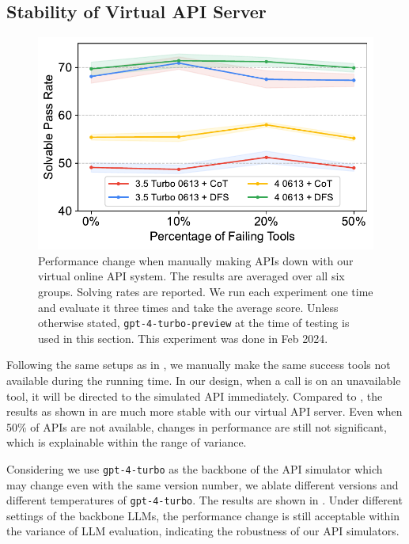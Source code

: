 \subsection{Stability of Virtual API Server}
\begin{figure}[h!]
    \centering
    \includegraphics[width=\linewidth]{figs/virtual_solving_scores.pdf}
    \caption{Performance change when manually making APIs down with our virtual online API system. The results are averaged over all six groups. Solving rates are reported. We run each experiment one time and evaluate it three times and take the average score. Unless otherwise stated, \texttt{gpt-4-turbo-preview} at the time of testing is used in this section. This experiment was done in Feb 2024.}
    \label{fig:simulated_api_stability_test}
\end{figure}

Following the same setups as in , we manually make the same success tools not available during the running time.
In our design, when a call is on an unavailable tool, it will be directed to the simulated API immediately.
Compared to , the results as shown in  are much more stable with our virtual API server.
Even when 50\% of APIs are not available, changes in performance are still not significant, which is explainable within the range of variance.



Considering we use \texttt{gpt-4-turbo} as the backbone of the API simulator which may change even with the same version number, we ablate different versions and different temperatures of \texttt{gpt-4-turbo}.
The results are shown in .
Under different settings of the backbone LLMs, the performance change is still acceptable within the variance of LLM evaluation, indicating the robustness of our API simulators.



